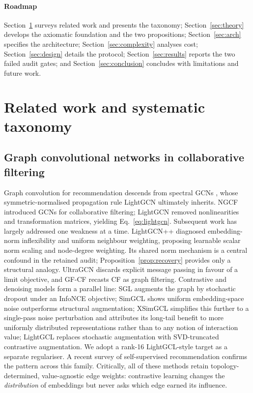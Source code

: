 \documentclass[a4paper,fleqn,longmktitle]{cas-dc}
\begin{document}
\paragraph{Roadmap}
Section~\ref{sec:related} surveys related work and presents the taxonomy;
Section~\ref{sec:theory} develops the axiomatic foundation and the two
propositions; Section~\ref{sec:arch} specifies the architecture;
Section~\ref{sec:complexity} analyses cost; Section~\ref{sec:design} details
the protocol; Section~\ref{sec:results} reports the two failed audit gates; and
Section~\ref{sec:conclusion} concludes with limitations and future work.

\section{Related work and systematic taxonomy}
\label{sec:related}

\subsection{Graph convolutional networks in collaborative filtering}
\label{sec:rw-gcn}

Graph convolution for recommendation descends from spectral GCNs
\citep{kipf2017gcn}, whose symmetric-normalised propagation rule LightGCN
ultimately inherits. NGCF \citep{wang2019ngcf} introduced GCNs for
collaborative filtering; LightGCN \citep{he2020lightgcn} removed
nonlinearities and transformation matrices, yielding
Eq.~\eqref{eq:lightgcn}. Subsequent work has largely
addressed one weakness at a time. LightGCN++ \citep{lee2024lightgcnpp}
diagnosed embedding-norm inflexibility and uniform neighbour weighting,
proposing learnable scalar norm scaling and node-degree weighting. Its shared
norm mechanism is a central confound in the retained audit; Proposition~\ref{prop:recovery}
provides only a structural analogy.
UltraGCN \citep{mao2021ultragcn} discards explicit message passing in favour
of a limit objective, and GF-CF \citep{shen2021powerful} recasts CF as graph
filtering. Contrastive and denoising models form a parallel line: SGL
\citep{wu2021sgl} augments the graph by stochastic dropout under an InfoNCE
objective; SimGCL \citep{yu2022simgcl} shows uniform embedding-space noise
outperforms structural augmentation; XSimGCL \citep{yu2024xsimgcl} simplifies
this further to a single-pass noise perturbation and attributes its long-tail
benefit to more uniformly distributed representations rather than to any
notion of interaction value; LightGCL \citep{cai2023lightgcl} replaces
stochastic augmentation with SVD-truncated contrastive augmentation. We adopt
a rank-16 LightGCL-style target as a separate regulariser. A recent
survey of self-supervised recommendation \citep{yu2024sslsurvey} confirms the
pattern across this family. Critically, all of these methods retain
topology-determined, value-agnostic edge weights: contrastive learning changes
the \emph{distribution} of embeddings but never asks which edge earned its
influence.
\end{document}
